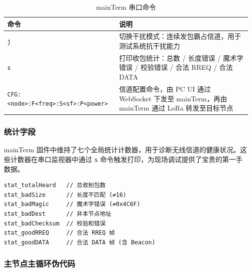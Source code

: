 \documentclass[12pt,a4paper]{ctexart}
\newcommand{\tblheaderstyle}{\sffamily\small\color{white}}
\begin{document}
\begin{table}[htbp]
\centering
\caption{mainTerm 串口命令}
\begin{tabularx}{\textwidth}{l >{\raggedright\arraybackslash}X}
\toprule
\rowcolor{tblhead}\tblheaderstyle 命令 & \tblheaderstyle 说明 \\
\midrule
\texttt{j} &
切换干扰模式：连续发包霸占信道，用于测试系统抗干扰能力 \\

\texttt{s} &
打印收包统计：总数 / 长度错误 / 魔术字错误 / 校验错误 / 合法 RREQ / 合法 DATA \\

\texttt{CFG:<node>:F<freq>:S<sf>:P<power>} &
信道配置命令，由 PC UI 通过 WebSocket 下发至 mainTerm，再由 mainTerm 通过 LoRa 转发至目标节点 \\
\bottomrule
\end{tabularx}
\end{table}

\subsubsection{统计字段}

mainTerm 固件中维持了七个全局统计计数器，用于诊断无线信道的健康状况。这些计数器在串口监视器中通过 \texttt{s} 命令触发打印，为现场调试提供了宝贵的第一手数据。

\begin{lstlisting}[]
stat_totalHeard   // 总收到包数
stat_badSize      // 长度不匹配 (≠16)
stat_badMagic     // 魔术字错误 (≠0x4C6F)
stat_badDest      // 非本节点地址
stat_badChecksum  // 校验和错误
stat_goodRREQ     // 合法 RREQ 帧
stat_goodDATA     // 合法 DATA 帧 (含 Beacon)
\end{lstlisting}

\subsubsection{主节点主循环伪代码}
\end{document}
